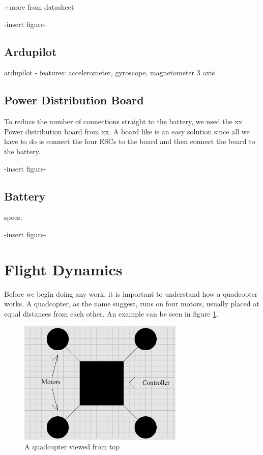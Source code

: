 +more from datasheet

-insert figure-

\subsection{Ardupilot}

ardupilot - features: accelerometer, gyroscope, magnetometer 3 axis

\subsection{Power Distribution Board}
To reduce the number of connections straight to the battery, we used the xx Power distribution board from xx. A board like is an easy solution since all we have to do is connect the four ESCs to the board and then connect the board to the battery.

-insert figure-

\subsection{Battery}
specs.

-insert figure-

\section{Flight Dynamics}
Before we begin doing any work, it is important to understand how a quadcopter works. A quadcopter, as the name suggest, runs on four motors, usually placed at equal distances from each other. An example can be seen in figure \ref{droneIdle}.
\begin{figure}[H]
  \centering
    \includegraphics[width=0.7\textwidth]{images/droneIdle.png}
	\caption{A quadcopter viewed from top}
	\label{droneIdle}
\end{figure}


